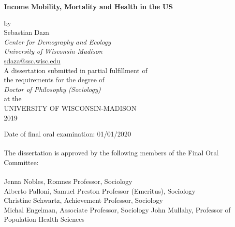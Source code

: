 \documentclass[12pt]{report}
\begin{document}

\thispagestyle{empty}

\renewcommand{\baselinestretch}{1}

\vspace*{60pt}

\begin{center}
\LARGE \textbf{Income Mobility, Mortality and Health in the US} \\
\vspace*{24pt}


\end{center}

\begin{center}
\normalsize
by \\
\vspace*{12pt}
Sebastian Daza \\
\textit{Center for Demography and Ecology \\University of Wisconsin-Madison}\\
\url{sdaza@ssc.wisc.edu}\\
\vspace*{40pt}
A dissertation submitted in partial fulfillment of \\
the requirements for the degree of\\
\vspace{12pt}
\textit{Doctor of Philosophy (Sociology)} \\
\vspace{12pt}
at the \\
\vspace{12pt}
UNIVERSITY OF WISCONSIN‐MADISON \\
\vspace{12pt}
2019
\end{center}

\vspace{60pt}
\noindent Date of final oral examination: 01/01/2020\\
\\
\noindent The dissertation is approved by the following members of the Final Oral Committee:\\
\\
\noindent Jenna Nobles, Romnes Professor, Sociology \\
\noindent Alberto Palloni, Samuel Preston Professor (Emeritus), Sociology\\
\noindent Christine Schwartz, Achievement Professor, Sociology\\
\noindent Michal Engelman, Associate Professor, Sociology
\noindent John Mullahy, Professor of Population Health Sciences
\end{document}
